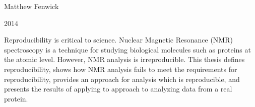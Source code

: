 \begin{titlepage}
  \begin{center}

  {\huge \mattftitle{}}

    \large

    \vspace{1cm}

    Matthew Fenwick

    2014
    
    Reproducibility is critical to science.
    Nuclear Magnetic Resonance (NMR) spectroscopy is a technique for studying 
    biological molecules such as proteins at the atomic level.
    However, NMR analysis is irreproducible.
    This thesis defines reproducibility, shows how NMR analysis fails to
    meet the requirements for reproducibility, provides an approach for analysis
    which is reproducible, and presents the results of applying to approach to
    analyzing data from a real protein.

  \end{center}
\end{titlepage}

